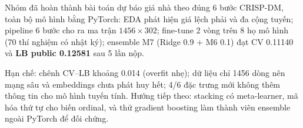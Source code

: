 \documentclass[a4paper,13pt]{article}
\begin{document}
Nhóm đã hoàn thành bài toán dự báo giá nhà theo đúng 6 bước CRISP-DM, toàn bộ mô hình bằng
PyTorch: EDA phát hiện giá lệch phải và đa cộng tuyến; pipeline 6 bước cho ra ma trận
$1456 \times 302$; fine-tune 2 vòng trên 8 họ mô hình (70 thí nghiệm có nhật ký);
ensemble M7 (Ridge 0.9 + M6 0.1) đạt CV 0.11140 và \textbf{LB public 0.12581} sau 5 lần nộp.

Hạn chế: chênh CV--LB khoảng 0.014 (overfit nhẹ); dữ liệu chỉ 1456 dòng nên mạng sâu và
embeddings chưa phát huy hết; 4/6 đặc trưng mới không thêm thông tin cho mô hình tuyến tính.
Hướng tiếp theo: stacking có meta-learner, mã hóa thứ tự cho biến ordinal, và thử
gradient boosting làm thành viên ensemble ngoài PyTorch để đối chứng.
\end{document}
